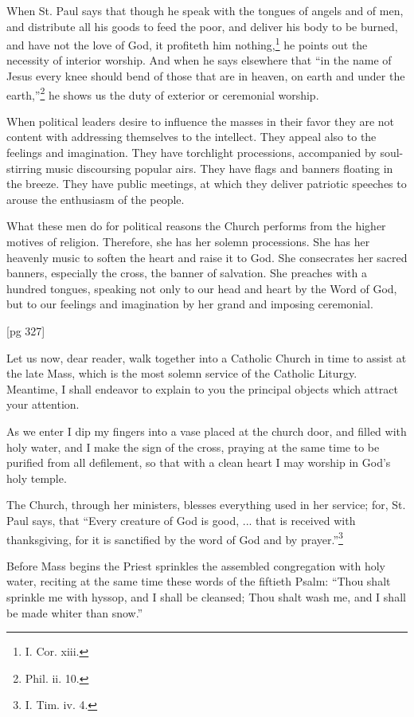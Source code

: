 When St. Paul says that though he speak with
the tongues of angels and of men, and distribute
all his goods to feed the poor, and deliver his body
to be burned, and have not the love of God, it
profiteth him nothing,\footnote{I.
Cor. xiii.} he points out the necessity
of interior worship. And when he says elsewhere
that “in the name of Jesus every knee should bend
of those that are in heaven, on earth and under the
earth,”\footnote{Phil. ii.
10.} he shows us the duty of exterior or ceremonial
worship.

When political leaders desire to influence the
masses in their favor they are not content with addressing
themselves to the intellect. They appeal
also to the feelings and imagination. They have
torchlight processions, accompanied by soul-stirring
music discoursing popular airs. They have
flags and banners floating in the breeze. They have
public meetings, at which they deliver patriotic
speeches to arouse the enthusiasm of the people.

What these men do for political reasons the
Church performs from the higher motives of religion.
Therefore, she has her solemn processions.
She has her heavenly music to soften the heart and
raise it to God. She consecrates her sacred banners,
especially the cross, the banner of salvation.
She preaches with a hundred tongues, speaking
not only to our head and heart by the Word of God,
but to our feelings and imagination by her grand
and imposing ceremonial.

[pg 327]


Let us now, dear reader, walk together into a
Catholic Church in time to assist at the late
Mass, which is the most solemn service of
the Catholic Liturgy. Meantime, I shall endeavor
to explain to you the principal objects which attract
your attention.

As we enter I dip my fingers into a vase placed
at the church door, and filled with holy water, and
I make the sign of the cross, praying at the same
time to be purified from all defilement, so that with
a clean heart I may worship in God's holy temple.

The Church, through her ministers, blesses
everything used in her service; for, St. Paul says,
that “Every creature of God is good, ... that is
received with thanksgiving, for it is sanctified by
the word of God and by prayer.”\footnote{I. Tim. iv. 4.}

Before Mass begins the Priest sprinkles the assembled
congregation with holy water, reciting
at the same time these words of the fiftieth
Psalm: “Thou shalt sprinkle me with hyssop, and
I shall be cleansed; Thou shalt wash me, and I
shall be made whiter than snow.”

